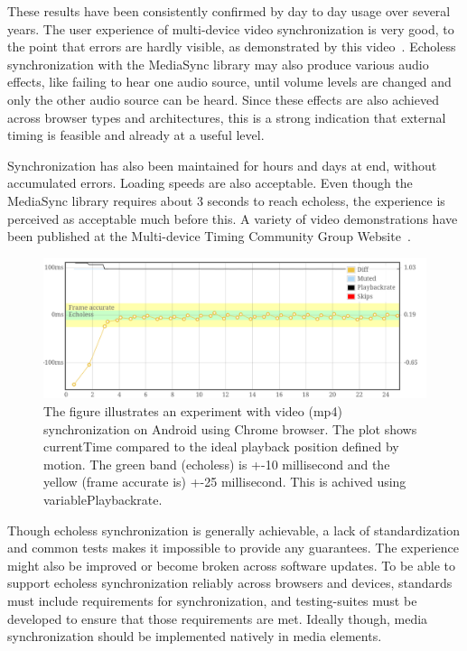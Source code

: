 These results have been consistently confirmed by day to day usage over
several years. The user experience of multi-device video synchronization is
very good, to the point that errors are hardly visible, as demonstrated by
this video~\cite{carneval}. Echoless synchronization with the MediaSync
library may also produce various audio effects, like failing to hear one audio
source, until volume levels are changed and only the other audio source can be
heard. Since these effects are also achieved across browser types and
architectures, this is a strong indication that external timing is feasible
and already at a useful level.

Synchronization has also been maintained for hours and days at end, without
accumulated errors. Loading speeds are also acceptable. Even though the
MediaSync library requires about 3 seconds to reach echoless, the experience
is perceived as acceptable much before this. A variety of video demonstrations
have been published at the Multi-device Timing Community Group
Website~\cite{mtcg}.

\begin{figure}[h]
\centering
\includegraphics[scale=.23]{fig/android-video.png}
\caption{The figure illustrates an experiment with video (mp4) synchronization on
Android using Chrome browser. The plot shows currentTime compared to the ideal
playback position defined by motion. The green band (echoless) is +-10 millisecond and
the yellow (frame accurate is) +-25 millisecond. This is achived using variablePlaybackrate.}
\label{fig:videosync}
\end{figure}

Though echoless synchronization is generally achievable, a lack of
standardization and common tests makes it impossible to provide any
guarantees. The experience might also be improved or become broken across
software updates. To be able to support echoless synchronization reliably
across browsers and devices, standards must include requirements for
synchronization, and testing-suites must be developed to ensure that those
requirements are met. Ideally though, media synchronization should be
implemented natively in media elements.


